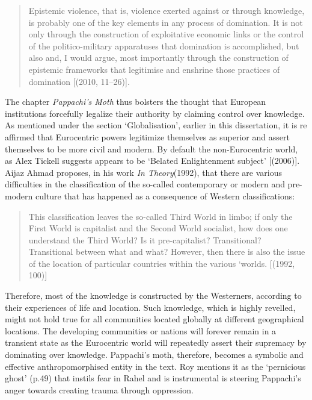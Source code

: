 \begin{quote}
  Epistemic violence, that is, violence exerted against or through knowledge, is probably one of the key elements in any process of domination. It is not only through the construction of exploitative economic links or the control of the politico-military apparatuses that domination is accomplished, but also and, I would argue, most importantly through the construction of epistemic frameworks that legitimise and enshrine those practices of domination [(2010, 11–26)]. 
\end{quote}

The chapter \emph{Pappachi’s Moth} thus bolsters the thought that European institutions forcefully legalize their authority by claiming control over knowledge. As mentioned under the section ‘Globalisation’, earlier in this dissertation, it is re affirmed that Eurocentric powers legitimize themselves as superior and assert themselves to be more civil and modern. By default the non-Eurocentric world, as Alex Tickell suggests appears to be ‘Belated Enlightenment subject’ [(2006)]. Aijaz Ahmad proposes, in his work \emph{In Theory}(1992), that there are various difficulties in the classification of the so-called contemporary or modern and pre-modern culture that has happened as a consequence of Western classifications: 

\begin{quote}
  This classification leaves the so-called Third World in limbo; if only the First World is capitalist and the Second World socialist, how does one understand the Third World? Is it pre-capitalist? Transitional? Transitional between what and what? However, then there is also the issue of the location of particular countries within the various ‘worlds. [(1992, 100)]
\end{quote}

Therefore, most of the knowledge is constructed by the Westerners, according to their experiences of life and location. Such knowledge, which is highly revelled, might not hold true for all communities located globally at different geographical locations. The developing communities or nations will forever remain in a transient state as the Eurocentric world will repeatedly assert their supremacy by dominating over knowledge. Pappachi’s moth, therefore, becomes a symbolic and effective anthropomorphised entity in the text. Roy mentions it as the ‘pernicious ghost’ (p.49) that instils fear in Rahel and is instrumental is steering Pappachi’s anger towards creating trauma through oppression.


